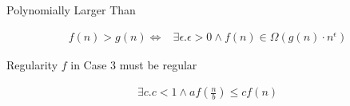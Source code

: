 \documentclass[10pt, a4paper,landscape]{article}
\begin{document}
\begin{multicols*}{4}
\begin{compactitem}
    \item[Polynomially Larger Than]
\end{compactitem}
\begin{align*}
    f(n) > g(n) \Leftrightarrow& \exists \epsilon. \epsilon > 0 \land f(n) \in \Omega(g(n) \cdot n^\epsilon)
\end{align*}

\begin{compactitem}
    \item[Regularity] $f$ in Case 3 must be regular
\end{compactitem}
\begin{align*}
    \exists c. c < 1 \land af\left(\frac n b\right) \leq cf(n)\\
\end{align*}

\end{multicols*}
\end{document}
